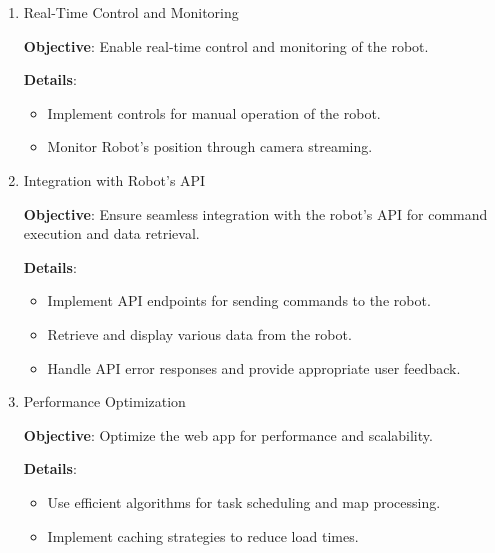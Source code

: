 \begin{enumerate}
    \item Real-Time Control and Monitoring
        
        \vspace{-1.5mm}
        \textbf{Objective}: Enable real-time control and monitoring of the robot.

        \vspace{-1.5mm}
        \textbf{Details}:
        \begin{itemize}
            \vspace{-1mm}
            \item Implement controls for manual operation of the robot.
            \vspace{-1mm}
            \item Monitor Robot's position through camera streaming.
        \end{itemize}


    \item Integration with Robot’s API
        
        \vspace{-1.5mm}
        \textbf{Objective}: Ensure seamless integration with the robot’s API for command execution and data retrieval.

        \vspace{-1.5mm}
        \textbf{Details}:
        \begin{itemize}
            \vspace{-1mm}
            \item Implement API endpoints for sending commands to the robot.
            \vspace{-1mm}
            \item Retrieve and display various data from the robot.
            \vspace{-1mm}
            \item Handle API error responses and provide appropriate user feedback.
        \end{itemize}

\newpage

    \item Performance Optimization
        
        \vspace{-1.5mm}
        \textbf{Objective}: Optimize the web app for performance and scalability.

        \vspace{-1.5mm}
        \textbf{Details}:
        \begin{itemize}
            \vspace{-1mm}
            \item Use efficient algorithms for task scheduling and map processing.
            \vspace{-1mm}
            \item Implement caching strategies to reduce load times.
        \end{itemize}
\end{enumerate}


